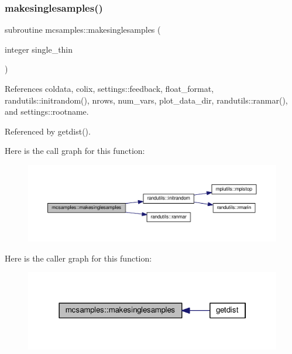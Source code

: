\subsubsection{\texorpdfstring{makesinglesamples()}{makesinglesamples()}}
{\footnotesize\ttfamily subroutine mcsamples\+::makesinglesamples (\begin{DoxyParamCaption}\item[{integer}]{single\+\_\+thin }\end{DoxyParamCaption})}



References coldata, colix, settings\+::feedback, float\+\_\+format, randutils\+::initrandom(), nrows, num\+\_\+vars, plot\+\_\+data\+\_\+dir, randutils\+::ranmar(), and settings\+::rootname.



Referenced by getdist().

Here is the call graph for this function\+:
\nopagebreak
\begin{figure}[H]
\begin{center}
\leavevmode
\includegraphics[width=350pt]{namespacemcsamples_a1e8b234ac939c21f51884cab29fd0204_cgraph}
\end{center}
\end{figure}
Here is the caller graph for this function\+:
\nopagebreak
\begin{figure}[H]
\begin{center}
\leavevmode
\includegraphics[width=322pt]{namespacemcsamples_a1e8b234ac939c21f51884cab29fd0204_icgraph}
\end{center}
\end{figure}
\mbox{\label{namespacemcsamples_ac831b94ceae7c808b2656230727e6cdd}} 
